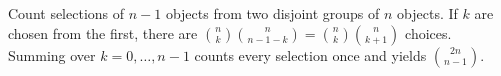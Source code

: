 Count selections of $n-1$ objects from two disjoint groups of $n$ objects. If $k$ are chosen from the first, there are $\binom nk\binom n{n-1-k}=\binom nk\binom n{k+1}$ choices. Summing over $k=0,\ldots,n-1$ counts every selection once and yields $\binom{2n}{n-1}$.
